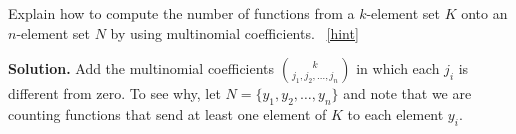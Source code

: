 \documentclass{book}
\begin{document}
\setcounter{project}{283}
\addtocounter{project}{-1}
\begin{activity}[]\label{activity-276}
\hypertarget{p-1500}{}%
Explain how to compute the number of functions from a \(k\)-element set \(K\) onto an \(n\)-element set \(N\) by using multinomial coefficients.%
~\hfill{\tiny\hyperlink{a-283}{[hint]}\hypertarget{q-283}{}}\par\smallskip%
\noindent\textbf{Solution.}\hypertarget{solution-221}{}\quad%
\hypertarget{p-1502}{}%
Add the multinomial coefficients \(\binom{k}{j_1,j_2,\ldots,j_n}\) in which each \(j_i\) is different from zero. To see why, let \(N=\{y_1,y_2,\ldots,y_n\}\) and note that we are counting functions that send at least one element of \(K\) to each element \(y_i\).%
\end{activity}
\end{document}
